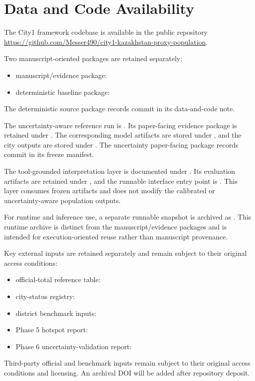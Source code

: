 \section*{Data and Code Availability}

The City1 framework codebase is available in the public repository \url{https://github.com/Messer490/city1-kazakhstan-proxy-population}.

Two manuscript-oriented packages are retained separately:
\begin{itemize}\setlength{\itemsep}{0pt}\setlength{\topsep}{0pt}
\item manuscript/evidence package: 
\item deterministic baseline package: 
\end{itemize}

The deterministic source package records commit  in its data-and-code note.

The uncertainty-aware reference run is . Its paper-facing evidence package is retained under . The corresponding model artifacts are stored under , and the city outputs are stored under . The uncertainty paper-facing package records commit  in its freeze manifest.

The tool-grounded interpretation layer is documented under . Its evaluation artifacts are retained under , and the runnable interface entry point is . This layer consumes frozen artifacts and does not modify the calibrated or uncertainty-aware population outputs.

For runtime and inference use, a separate runnable snapshot is archived as . This runtime archive is distinct from the manuscript/evidence packages and is intended for execution-oriented reuse rather than manuscript provenance.

Key external inputs are retained separately and remain subject to their original access conditions:
\begin{itemize}\setlength{\itemsep}{0pt}\setlength{\topsep}{0pt}
\item official-total reference table: 
\item city-status registry: 
\item district benchmark inputs: 
\item Phase 5 hotspot report: 
\item Phase 6 uncertainty-validation report: 
\end{itemize}

Third-party official and benchmark inputs remain subject to their original access conditions and licensing. An archival DOI will be added after repository deposit.
